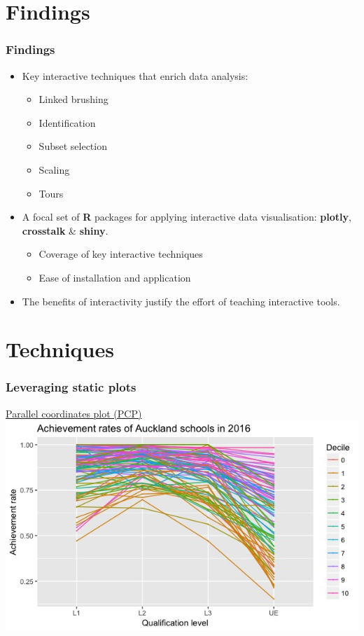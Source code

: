 \documentclass{beamer}
\begin{document}
\section{Findings}
\label{sec:findings}

	\begin{frame}
		\frametitle{Findings}
		\begin{itemize}
			\item Key interactive techniques that enrich data analysis:
			\begin{itemize}
				\item Linked brushing
				\item Identification
				\item Subset selection
				\item Scaling 
				\item Tours
			\end{itemize}
			\item A focal set of \textbf{R} packages for applying interactive data visualisation: \textbf{plotly}, \textbf{crosstalk} \& \textbf{shiny}.
			\begin{itemize}
				\item Coverage of key interactive techniques
				\item Ease of installation and application
			\end{itemize}
		\item The benefits of interactivity justify the effort of teaching interactive tools.
		\end{itemize}
	\end{frame}

\section{Techniques}
\label{sec:techniques}

	\begin{frame}
		\frametitle{Leveraging static plots}
		\href{https://shanl33.shinyapps.io/presentation_pcp/}{Parallel coordinates plot (PCP)} 
		\href{https://screencast-o-matic.com/watch/cbXlcM2oyE}{\beamergotobutton{Demo}}
		\includegraphics[scale=0.45]{files/pcp.jpeg}
	\end{frame}
\end{document}
